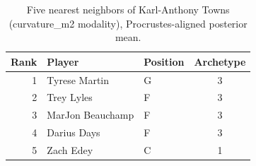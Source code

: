 \begin{table}[htbp]
  \centering\small
  \begin{tabular}{rllc}
    \toprule
    Rank & Player & Position & Archetype \\
    \midrule
    1 & Tyrese Martin & G & 3 \\
    2 & Trey Lyles & F & 3 \\
    3 & MarJon Beauchamp & F & 3 \\
    4 & Darius Days & F & 3 \\
    5 & Zach Edey & C & 1 \\
    \bottomrule
  \end{tabular}
  \caption{Five nearest neighbors of Karl-Anthony Towns (curvature_m2 modality), Procrustes-aligned posterior mean.}
  \label{tab:Karl_Anthony_Towns_neighbors_curvature_m2}
\end{table}

